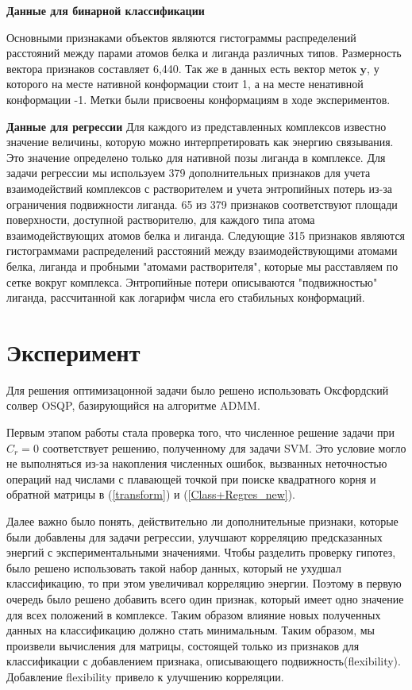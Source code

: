 \documentclass[CEJM,PDF]{Class+Reg_in_Molec_Docking} %
\begin{document}
\textbf{Данные для бинарной классификации}
\medskip

Основными признаками объектов являются гистограммы распределений расстояний между парами атомов белка и лиганда различных типов. Размерность вектора признаков составляет 6,440. Так же в данных есть вектор меток $\mathbf{y}$, у которого на месте нативной конформации стоит 1, а на месте ненативной конформации -1. Метки были присвоены конформациям в ходе экспериментов.

\textbf{Данные для регрессии}
\medskip
Для каждого из представленных комплексов известно значение величины, которую можно интерпретировать как энергию связывания. Это значение определено только для нативной позы лиганда в комплексе. 
%
Для задачи регрессии мы используем 379 дополнительных признаков для учета взаимодействий комплексов с растворителем и учета энтропийных потерь из-за ограничения подвижности лиганда. 65 из 379 признаков соответствуют площади поверхности, доступной растворителю, для каждого типа атома взаимодействующих атомов белка и лиганда. Следующие 315 признаков являются гистограммами распределений расстояний между взаимодействующими атомами белка, лиганда и пробными "атомами растворителя", которые мы расставляем по сетке вокруг комплекса. Энтропийные потери описываются "подвижностью" лиганда, рассчитанной как логарифм числа его стабильных конформаций.


\section{Эксперимент}
Для решения оптимизацонной задачи было решено использовать Оксфордский солвер OSQP\cite{osqp,osqp-codegen}, базирующийся на алгоритме ADMM\cite{osqp-infeasibility}.

\hspace{1cm} Первым этапом работы стала проверка того, что численное решение задачи при $C_r = 0$ соответствует решению, полученному для задачи SVM. Это условие могло не выполняться из-за накопления численных ошибок, вызванных неточностью операций над числами с плавающей точкой при поиске квадратного корня и обратной матрицы в (\ref{transform}) и (\ref{Class+Regres_new}). 

Далее важно было понять, действительно ли дополнительные признаки, которые были добавлены для задачи регрессии, улучшают корреляцию предсказанных энергий с экспериментальными значениями. Чтобы разделить проверку гипотез, было решено использовать такой набор данных, который не ухудшал классификацию, то при этом увеличивал корреляцию энергии. Поэтому в первую очередь было решено добавить всего один признак, который имеет одно значение для всех положений в комплексе. Таким образом влияние новых полученных данных на классификацию должно стать минимальным.
Таким образом, мы произвели вычисления для матрицы, состоящей только из признаков для классификации с добавлением признака, описывающего подвижность(flexibility). Добавление flexibility привело к улучшению корреляции.
\end{document}

